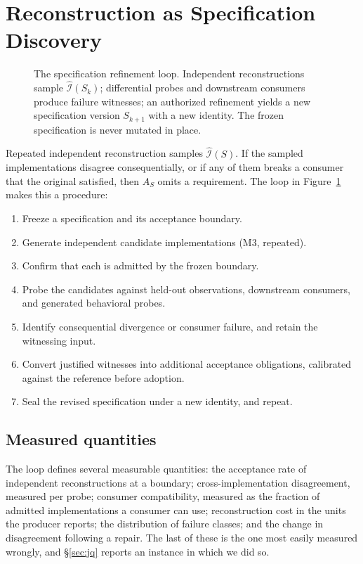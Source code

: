 \documentclass[10pt,twocolumn]{article}
\begin{document}
\section{Reconstruction as Specification Discovery}
\label{sec:discovery}

\begin{figure}[t]
\centering

\caption{The specification refinement loop. Independent reconstructions
sample $\widehat{\mathcal{I}}(S_k)$; differential probes and downstream
consumers
produce failure witnesses; an authorized refinement yields a new
specification version $S_{k+1}$ with a new identity. The frozen
specification is never mutated in place.}
\label{fig:loop}
\end{figure}

Repeated independent reconstruction samples $\widehat{\mathcal{I}}(S)$.
If the
sampled implementations disagree consequentially, or if any of them
breaks a consumer that the original satisfied, then $A_S$ omits a
requirement. The loop in Figure~\ref{fig:loop} makes this a procedure:

\begin{enumerate}\itemsep1pt
\item Freeze a specification and its acceptance boundary.
\item Generate independent candidate implementations (M3, repeated).
\item Confirm that each is admitted by the frozen boundary.
\item Probe the candidates against held-out observations, downstream
      consumers, and generated behavioral probes.
\item Identify consequential divergence or consumer failure, and retain
      the witnessing input.
\item Convert justified witnesses into additional acceptance
      obligations, calibrated against the reference before adoption.
\item Seal the revised specification under a new identity, and repeat.
\end{enumerate}

\subsection{Measured quantities}

The loop defines several measurable quantities: the acceptance rate of
independent reconstructions at a boundary; cross-implementation
disagreement, measured per probe; consumer compatibility, measured as the
fraction of admitted implementations a consumer can use; reconstruction
cost in the units the producer reports; the distribution of failure
classes; and the change in disagreement following a repair. The last of
these is the one most easily measured wrongly, and
\S\ref{sec:jq} reports an instance in which we did so.
\end{document}

